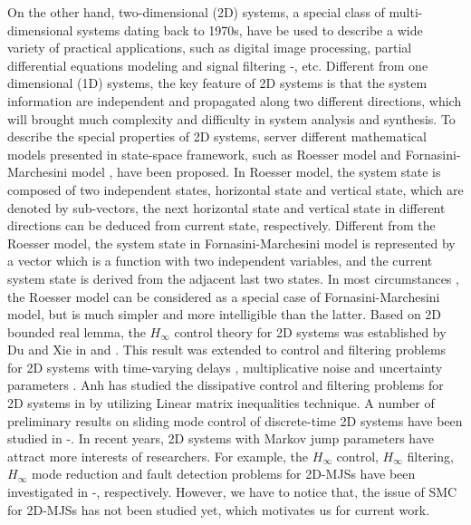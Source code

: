 \documentclass[conference]{IEEEtran}
\begin{document}
	
	On the other hand, two-dimensional (2D) systems, a special class of multi-dimensional systems  dating back to 1970s,  have be used to describe a wide variety of practical applications, such as digital image processing, partial differential equations modeling and signal filtering \cite{roesser}-\cite{signal-processing}, etc. Different from one dimensional (1D) systems, the key feature of  2D systems is that the system information are independent and propagated along two different directions, which will brought much complexity and difficulty in system analysis and synthesis. To describe the special properties of 2D systems, server different mathematical models presented in state-space framework, such as Roesser model \cite{roesser} and Fornasini-Marchesini model \cite{FM-model}, have been proposed. In Roesser model, the system state is composed of two independent states, horizontal state and vertical state, which are denoted by  sub-vectors, the next horizontal state and vertical state in different directions can be deduced from current state, respectively. Different from the Roesser model, the system state in Fornasini-Marchesini model is represented by a vector which is a function with two independent variables, and the current system state is derived from the adjacent last two states. In most circumstances , the Roesser model can be considered as a special case of Fornasini-Marchesini model, but is much simpler and more intelligible than the latter. Based on 2D bounded real lemma, the $H_{\infty}$ control theory for 2D systems was established by Du and Xie in \cite{du-chunling&l-xie} and \cite{Du-Xie}. This result was extended to control and filtering problems for 2D systems with time-varying delays \cite{tile-varing-delay},  multiplicative noise \cite{Ahn-noise} and uncertainty parameters \cite{Uncertainty-parmeters2D}. 
	Anh has studied  the dissipative control and filtering problems for 2D systems in \cite{Ahn-2}  by utilizing Linear matrix inequalities technique.
	A number of preliminary results on sliding mode control of discrete-time 2D systems have been studied in \cite{SMC2D1}-\cite{SMC2D3}.
	In recent years, 2D systems with Markov jump parameters have attract more interests of researchers. For example,  the $H_{\infty}$ control, $H_{\infty}$ filtering, $H_{\infty}$ mode reduction and fault detection problems for 2D-MJSs have been investigated in \cite{Markov-Gao}-\cite{fault-dectction-shenying}, respectively. However, we have to notice that, the issue of SMC for 2D-MJSs has not been studied yet, which motivates us for current work.
	 
\end{document}
